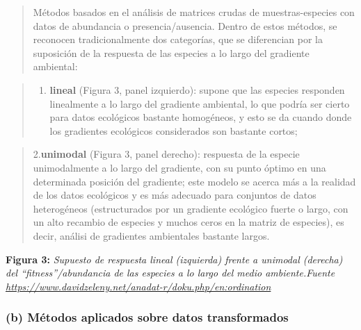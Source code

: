 \documentclass[
]{book}
\providecommand{\tightlist}{%
  \setlength{\itemsep}{0pt}\setlength{\parskip}{0pt}}
\begin{document}
\begin{quote}
Métodos basados en el análisis de matrices crudas de muestras-especies con datos de abundancia o presencia/ausencia. Dentro de estos métodos, se reconocen tradicionalmente dos categorías, que se diferencian por la suposición de la respuesta de las especies a lo largo del gradiente ambiental:
\end{quote}

\begin{quote}
\begin{enumerate}
\def\labelenumi{\arabic{enumi}.}
\tightlist
\item
  \textbf{lineal} (Figura 3, panel izquierdo): supone que las especies responden linealmente a lo largo del gradiente ambiental, lo que podría ser cierto para datos ecológicos bastante homogéneos, y esto se da cuando donde los gradientes ecológicos considerados son bastante cortos;
\end{enumerate}
\end{quote}

\begin{quote}
2.\textbf{unimodal} (Figura 3, panel derecho): respuesta de la especie unimodalmente a lo largo del gradiente, con su punto óptimo en una determinada posición del gradiente; este modelo se acerca más a la realidad de los datos ecológicos y es más adecuado para conjuntos de datos heterogéneos (estructurados por un gradiente ecológico fuerte o largo, con un alto recambio de especies y muchos ceros en la matriz de especies), es decir, análisi de gradientes ambientales bastante largos.
\end{quote}

\textbf{Figura 3:} \emph{Supuesto de respuesta lineal (izquierda) frente a unimodal (derecha) del ``fitness''/abundancia de las especies a lo largo del medio ambiente.Fuente \url{https://www.davidzeleny.net/anadat-r/doku.php/en:ordination}}

\hypertarget{b-muxe9todos-aplicados-sobre-datos-transformados}{%
\subsubsection{(b) Métodos aplicados sobre datos transformados}\label{b-muxe9todos-aplicados-sobre-datos-transformados}}
\end{document}
